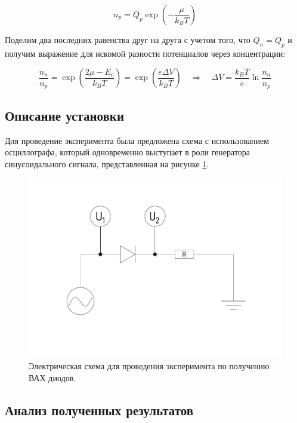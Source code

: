\documentclass[a4paper, 12pt]{article}
\newcommand{\qrq}
{\ensuremath{\quad \Rightarrow \quad}} %
\begin{document}
\begin{equation}
	n_p = Q_p \exp\left(-\frac{\mu}{k_B T}\right)
\end{equation}

Поделим два последних равенства друг на друга с учетом того, что $Q_n = Q_p$ и получим выражение для искомой разности потенциалов через концентрации:

\begin{equation}
	\frac{n_n}{n_p} = \exp\left(\frac{2\mu - E_\text{c}}{k_B T}\right) = \exp\left(\frac{e \Delta V}{k_B T}\right) \qrq \Delta V = \frac{k_B T}{e} \ln \frac{n_n}{n_p}
\end{equation}

\subsection{Описание установки}

Для проведение эксперимента была предложена схема с использованием осциллографа, который одновременно выступает в роли генератора синусоидального сигнала, представленная на рисунке \ref{fig:2_Experiment_Scheme}.

\begin{figure}[H]
	\centering
	\includegraphics[width=\linewidth]{2_Experiment_Scheme}
	\caption{Электрическая схема для проведения эксперимента по получению ВАХ диодов.}
	\label{fig:2_Experiment_Scheme}
\end{figure}

\subsection{Анализ полученных результатов}
\end{document}
